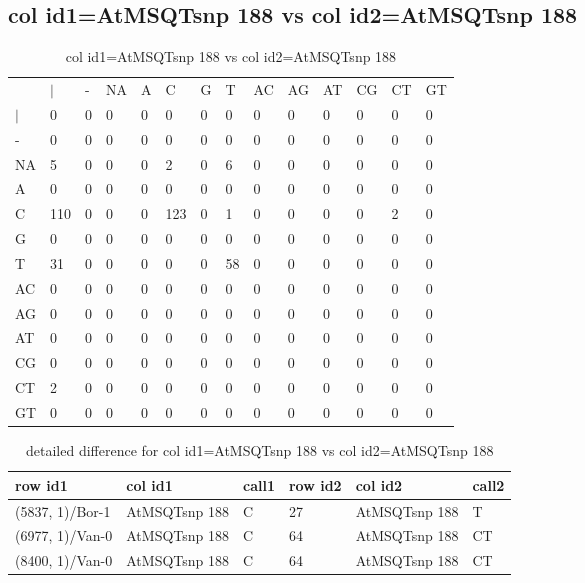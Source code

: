 \subsection{col id1=AtMSQTsnp 188 vs col id2=AtMSQTsnp 188}
\begin{center}
\begin{longtable}{|l|l|l|l|l|l|l|l|l|l|l|l|l|l|}
\caption{col id1=AtMSQTsnp 188 vs col id2=AtMSQTsnp 188} \label{table_dm754}\\
\hline
\\
\hline
&$|$&-&NA&A&C&G&T&AC&AG&AT&CG&CT&GT\\
$|$&0&0&0&0&0&0&0&0&0&0&0&0&0\\
-&0&0&0&0&0&0&0&0&0&0&0&0&0\\
NA&5&0&0&0&2&0&6&0&0&0&0&0&0\\
A&0&0&0&0&0&0&0&0&0&0&0&0&0\\
C&110&0&0&0&123&0&1&0&0&0&0&2&0\\
G&0&0&0&0&0&0&0&0&0&0&0&0&0\\
T&31&0&0&0&0&0&58&0&0&0&0&0&0\\
AC&0&0&0&0&0&0&0&0&0&0&0&0&0\\
AG&0&0&0&0&0&0&0&0&0&0&0&0&0\\
AT&0&0&0&0&0&0&0&0&0&0&0&0&0\\
CG&0&0&0&0&0&0&0&0&0&0&0&0&0\\
CT&2&0&0&0&0&0&0&0&0&0&0&0&0\\
GT&0&0&0&0&0&0&0&0&0&0&0&0&0\\
\hline
\end{longtable}
\end{center}

\begin{center}
\begin{longtable}{|l|l|l|l|l|l|}
\caption{detailed difference for col id1=AtMSQTsnp 188 vs col id2=AtMSQTsnp 188} \label{table_dm755}\\
\hline
row id1&col id1&call1&row id2&col id2&call2\\
\hline
(5837, 1)/Bor-1&AtMSQTsnp 188&C&27&AtMSQTsnp 188&T\\
(6977, 1)/Van-0&AtMSQTsnp 188&C&64&AtMSQTsnp 188&CT\\
(8400, 1)/Van-0&AtMSQTsnp 188&C&64&AtMSQTsnp 188&CT\\
\hline
\end{longtable}
\end{center}

